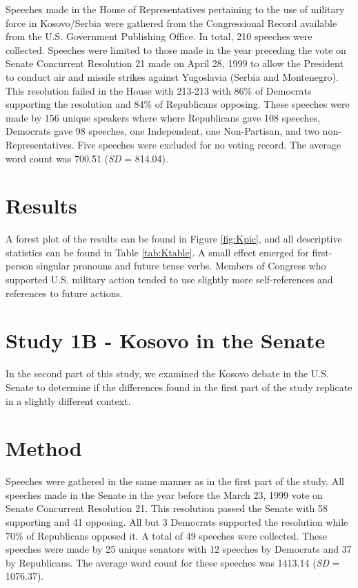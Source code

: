 \documentclass[english,,man]{apa6}
\theoremstyle{definition}
\theoremstyle{definition}
\theoremstyle{definition}
\theoremstyle{remark}
\begin{document}
Speeches made in the House of Representatives pertaining to the use of
military force in Kosovo/Serbia were gathered from the Congressional
Record available from the U.S. Government Publishing Office. In total,
210 speeches were collected. Speeches were limited to those made in the
year preceding the vote on Senate Concurrent Resolution 21 made on April
28, 1999 to allow the President to conduct air and missile strikes
against Yugoslavia (Serbia and Montenegro). This resolution failed in
the House with 213-213 with 86\% of Democrats supporting the resolution
and 84\% of Republicans opposing. These speeches were made by 156 unique
speakers where where Republicans gave 108 speeches, Democrats gave 98
speeches, one Independent, one Non-Partisan, and two
non-Representatives. Five speeches were excluded for no voting record.
The average word count was 700.51 (\emph{SD} = 814.04).

\hypertarget{results}{%
\section{Results}\label{results}}

A forest plot of the results can be found in Figure \ref{fig:Kpic}, and
all descriptive statistics can be found in Table \ref{tab:Ktable}. A
small effect emerged for first-person singular pronouns and future tense
verbs. Members of Congress who supported U.S. military action tended to
use slightly more self-references and references to future actions.

\hypertarget{study-1b---kosovo-in-the-senate}{%
\section{Study 1B - Kosovo in the
Senate}\label{study-1b---kosovo-in-the-senate}}

In the second part of this study, we examined the Kosovo debate in the
U.S. Senate to determine if the differences found in the first part of
the study replicate in a slightly different context.

\hypertarget{method-2}{%
\section{Method}\label{method-2}}

Speeches were gathered in the same manner as in the first part of the
study. All speeches made in the Senate in the year before the March 23,
1999 vote on Senate Concurrent Resolution 21. This resolution passed the
Senate with 58 supporting and 41 opposing. All but 3 Democrats supported
the resolution while 70\% of Republicans opposed it. A total of 49
speeches were collected. These speeches were made by 25 unique senators
with 12 speeches by Democrats and 37 by Republicans. The average word
count for these speeches was 1413.14 (\emph{SD} = 1076.37).
\end{document}
